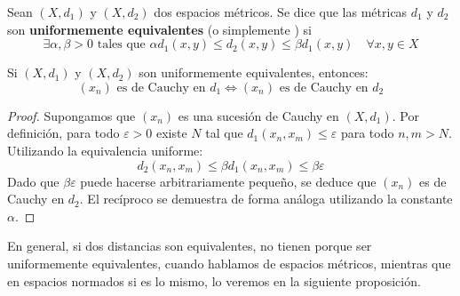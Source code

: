 \begin{definicion}
    Sean $(X, d_1)$ y $(X, d_2)$ dos espacios métricos. Se dice que las métricas $d_1$ y $d_2$ son \textbf{uniformemente equivalentes} (o simplemente ) si
    \begin{equation*}
        \exists \alpha, \beta > 0 \text{ tales que } \alpha d_1(x, y) \leq d_2(x, y) \leq \beta d_1(x, y) \quad \forall x, y \in X
    \end{equation*}
\end{definicion}


\begin{prop}
    Si $(X, d_1)$ y $(X, d_2)$ son uniformemente equivalentes, entonces:
    \begin{equation*}
        (x_n) \text{ es de Cauchy en } d_1 \iff (x_n) \text{ es de Cauchy en } d_2
    \end{equation*}
\end{prop}

\begin{proof}
    Supongamos que $(x_n)$ es una sucesión de Cauchy en $(X, d_1)$. Por definición, para todo $\varepsilon > 0$ existe $N$ tal que $d_1(x_n, x_m) \leq \varepsilon$ para todo $n, m > N$. Utilizando la equivalencia uniforme:
    \begin{equation*}
        d_2(x_n, x_m) \leq \beta d_1(x_n, x_m) \leq \beta \varepsilon
    \end{equation*}
    Dado que $\beta \varepsilon$ puede hacerse arbitrariamente pequeño, se deduce que $(x_n)$ es de Cauchy en $d_2$. El recíproco se demuestra de forma análoga utilizando la constante $\alpha$.
\end{proof}

\noindent
En general, si dos distancias son equivalentes, no tienen porque ser uniformemente equivalentes, cuando hablamos de espacios métricos, mientras que en espacios normados si es lo mismo, lo veremos en la siguiente proposición.


